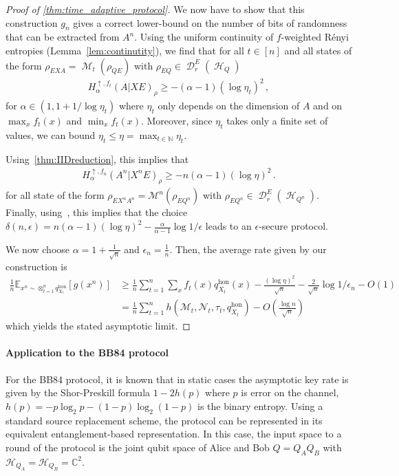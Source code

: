 \documentclass[11pt]{article}
\newcommand{\1}{\ensuremath{\mathbbm{1}}}
\theoremstyle{newdefinition}
\theoremstyle{newplain}
\theoremstyle{myplain}
\DeclareMathOperator{\cH}{\mathcal{H}}
\DeclareMathOperator{\cM}{\mathcal{M}}
\DeclareMathOperator{\cD}{\mathcal{D}}
\begin{document}
\begin{proof}[Proof of \cref{thm:time_adaptive_protocol}]
We now have to show that this construction $g_n$ gives a correct lower-bound on the number of bits of randomness that can be extracted from $A^n$. Using the uniform continuity of $f$-weighted Rényi entropies (Lemma~\ref{lem:continutity}), we find that for all $t \in [n]$ and all states of the form $\rho_{EXA} = \cM_t(\rho_{QE})$ with $\rho_{EQ} \in \cD_r^E(\cH_{Q})$
\begin{align}
    H_\alpha^{\uparrow,f_t}(A|XE)_{\rho} \geq -(\alpha-1) (\log \eta_t)^2 \,,
\end{align}
for $\alpha \in (1,1+1/\log \eta_t)$ where $\eta_t$ only depends on the dimension of $A$ and on $\max_x f_t(x)$ and $\min_x f_t(x)$. Moreover, since $\eta_t$ takes only a finite set of values, we can bound $\eta_t \leq \eta = \max_{t\in \mathbb N} \eta_t$.  

Using~\cref{thm:IIDreduction}, this implies that 
\begin{align}
    H_\alpha^{\uparrow, f_n}(A^n|X^nE)_{\rho} \geq - n (\alpha-1) (\log \eta)^2\,.
\end{align}
for all state of the form $\rho_{EX^nA^n} = \mathcal{M}^n(\rho_{EQ^n})$ with $\rho_{EQ^n}\in \cD_r^E(\cH_{Q^n})$. Finally, using~\cite[Theorem 1]{Himbeeck.2025}, this implies that the choice $\delta(n,\epsilon) = n (\alpha-1) (\log \eta)^2 - \frac{\alpha}{\alpha-1}\log{1/\epsilon}$ leads to an $\epsilon$-secure protocol. 

We now choose $\alpha = 1 + \tfrac{1}{\sqrt{n}}$ and $\epsilon_n = \frac{1}{n}$. Then, the average rate given by our construction is
\begin{align}
    \frac{1}{n} \mathbb E_{x^n \sim \otimes_{t=1}^n q_{X_t}^{\mathrm{hon}}}[g(x^n)]
        &\geq \frac{1}{n} \sum_{t=1}^n \sum_{x} f_t(x)q^{\mathrm{hon}}_{X_t}(x) - \frac{(\log \eta)^2}{\sqrt{n}} - \frac{2}{\sqrt{n}} \log{1/\epsilon_n} -O(1)\\
        &= \frac{1}{n} \sum_{t=1}^n h(\mathcal M_t,\mathcal N_t,\tau_t,q^{\mathrm{hon}}_{X_t}) - O(\tfrac{\log n}{\sqrt{n}})
\end{align}
which yields the stated asymptotic limit.
\end{proof}

\paragraph{Application to the BB84 protocol}

For the BB84 protocol, it is known that in static cases the asymptotic key rate is given by the Shor-Preskill formula $1-2h(p)$ where $p$ is error on the channel, $h(p) = -p \log_2 p - (1-p)\log_2 (1-p)$ is the binary entropy. Using a standard source replacement scheme, the protocol can be represented in its equivalent entanglement-based representation. In this case, the input space to a round of the protocol is the joint qubit space of Alice and Bob $Q = Q_AQ_B$ with $\mathcal{H}_{Q_A} = \mathcal{H}_{Q_B} = \mathbb{C}^{2}$. 
\end{document}
